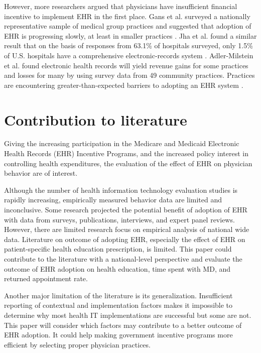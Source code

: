 \documentclass[12pt]{report}
\begin{document}
However, more researchers argued that physicians have insufficient financial incentive to implement EHR in the first place. Gans et al. surveyed a nationally representative sample of medical group practices and suggested that adoption of EHR is progressing slowly, at least in smaller practices \citep{Gans2005}. Jha et al. found a similar result that on the basis of responses from 63.1\% of hospitals surveyed, only 1.5\% of U.S. hospitals have a comprehensive electronic-records system \citep{Jha2009}. Adler-Milstein et al. found electronic health records will yield revenue gains for some practices and losses for many by using survey data from 49 community practices. Practices are encountering greater-than-expected barriers to adopting an EHR system \citep{Adler-Milstein2012}.

\section{Contribution to literature}

Giving the increasing participation in the Medicare and Medicaid Electronic Health Records (EHR) Incentive Programs, and the increased policy interest in controlling health expenditures, the evaluation of the effect of EHR on physician behavior are of interest.

Although the number of health information technology evaluation studies is rapidly increasing, empirically measured behavior data are limited and inconclusive. Some research projected the potential benefit of adoption of EHR with data from surveys, publications, interviews, and expert panel reviews. However, there are limited research focus on empirical analysis of national wide data. Literature on outcome of adopting EHR, especially the effect of EHR on patient-specific health education prescription, is limited. This paper could contribute to the literature with a national-level perspective and evaluate the outcome of EHR adoption on health education, time spent with MD, and returned appointment rate.

Another major limitation of the literature is its generalization. Insufficient reporting of contextual and implementation factors makes it impossible to determine why most health IT implementations are successful but some are not. This paper will consider which factors may contribute to a better outcome of EHR adoption. It could help making government incentive programs more efficient by selecting proper physician practices.
\end{document}
